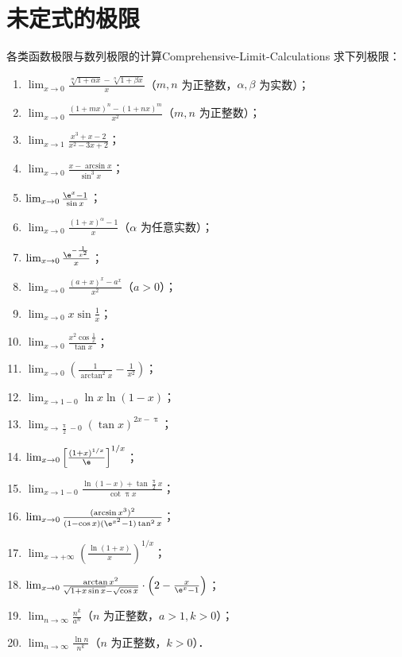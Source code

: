 \section{未定式的极限}

\begin{problem}{各类函数极限与数列极限的计算}{Comprehensive-Limit-Calculations}
    求下列极限：
    \begin{enumerate}
        \item $\lim_{x\to 0} \frac{\sqrt[m]{1+\alpha x} - \sqrt[n]{1+\beta x}}{x}$（$m, n$ 为正整数，$\alpha, \beta$ 为实数）；
        \item $\lim_{x\to 0} \frac{(1+mx)^n - (1+nx)^m}{x^2}$（$m, n$ 为正整数）；
        \item $\lim_{x\to 1} \frac{x^3 + x - 2}{x^2 - 3x + 2}$；
        \item $\lim_{x\to 0} \frac{x - \arcsin x}{\sin^3 x}$；
        \item $\lim_{x\to 0} \frac{\e^x - 1}{\sin x}$；
        \item $\lim_{x\to 0} \frac{(1+x)^\alpha - 1}{x}$（$\alpha$ 为任意实数）；
        \item $\lim_{x\to 0} \frac{\e^{-\frac{1}{x^2}}}{x}$；
        \item $\lim_{x\to 0} \frac{(a+x)^x - a^x}{x^2}$（$a > 0$）；
        \item $\lim_{x\to 0} x \sin \frac{1}{x}$；
        \item $\lim_{x\to 0} \frac{x^2 \cos \frac{1}{x}}{\tan x}$；
        \item $\lim_{x\to 0} \left( \frac{1}{\arctan^2 x} - \frac{1}{x^2} \right)$；
        \item $\lim_{x\to 1-0} \ln x \ln(1 - x)$；
        \item $\lim_{x\to \frac{\uppi}{2}-0} (\tan x)^{2x - \uppi}$；
        \item $\lim_{x\to 0} \left[ \frac{(1+x)^{1/x}}{\e} \right]^{1/x}$；
        \item $\lim_{x\to 1-0} \frac{\ln(1-x) + \tan \frac{\uppi}{2}x}{\cot \uppi x}$；
        \item $\lim_{x\to 0} \frac{(\arcsin x^3)^2}{(1 - \cos x)(\e^{x^2} - 1)\tan^2 x}$；
        \item $\lim_{x\to +\infty} \left( \frac{\ln(1+x)}{x} \right)^{1/x}$；
        \item $\lim_{x\to 0} \frac{\arctan x^2}{\sqrt{1 + x\sin x} - \sqrt{\cos x}} \cdot \left( 2 - \frac{x}{\e^x - 1} \right)$；
        \item $\lim_{n\to\infty} \frac{n^k}{a^n}$（$n$ 为正整数，$a > 1, k > 0$）；
        \item $\lim_{n\to\infty} \frac{\ln n}{n^k}$（$n$ 为正整数，$k > 0$）．
    \end{enumerate}
\end{problem}

